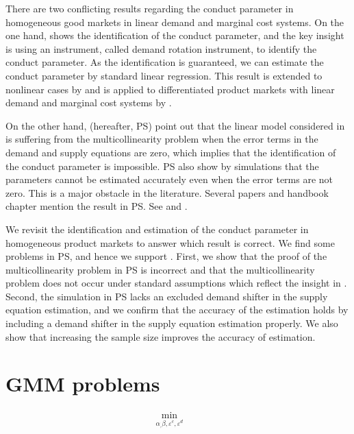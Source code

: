 \documentclass[11pt, a4paper]{article}
\begin{document}
There are two conflicting results regarding the conduct parameter in homogeneous good markets in linear demand and marginal cost systems.
On the one hand, \citet{bresnahan1982oligopoly} shows the identification of the conduct parameter, and the key insight is using an instrument, called demand rotation instrument, to identify the conduct parameter.
As the identification is guaranteed, we can estimate the conduct parameter by standard linear regression.
This result is extended to nonlinear cases by \citet{lau1982identifying}
and is applied to differentiated product markets with linear demand and marginal cost systems by  \citet{nevoIdentificationOligopolySolution1998}.

On the other hand, \citet{perloff2012collinearity} (hereafter, PS) point out that the linear model considered in \citet{bresnahan1982oligopoly} is suffering from the multicollinearity problem when the error terms in the demand and supply equations are zero, which implies that the identification of the conduct parameter is impossible.
PS also show by simulations that the parameters cannot be estimated accurately even when the error terms are not zero. 
This is a major obstacle in the literature. 
Several papers and handbook chapter mention the result in PS. See \citet{claessensWhatDrivesBank2004, coccoreseMultimarketContactCompetition2013, coccoreseWhatAffectsBank2021, garciaMarketStructuresProduction2020, kumbhakarNewMethodEstimating2012, perekhozhukRegionalLevelAnalysisOligopsony2015} and \citet{shafferMarketPowerCompetition2017}.

We revisit the identification and estimation of the conduct parameter in homogeneous product markets to answer which result is correct.
We find some problems in PS, and hence we support \cite{bresnahan1982oligopoly}.
First, we show that the proof of the multicollinearity problem in PS is incorrect and that the multicollinearity problem does not occur under standard assumptions which reflect the insight in \citet{bresnahan1982oligopoly}.
Second, the simulation in PS lacks an excluded demand shifter in the supply equation estimation, and we confirm that the accuracy of the estimation holds by including a demand shifter in the supply equation estimation properly. 
We also show that increasing the sample size improves the accuracy of estimation.



\section{GMM problems}
\begin{align}
    \min_{\alpha_, \beta, \varepsilon^c, \varepsilon^d}\quad &  
\end{align}





\end{document}
